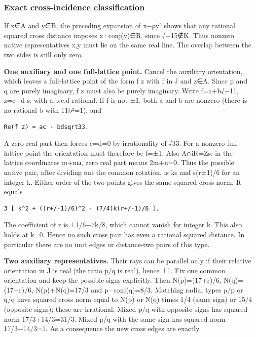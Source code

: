\documentclass[
  11pt,
]{article}
\begin{document}
\subsubsection{Exact cross-incidence
classification}\label{exact-cross-incidence-classification}

If x∈A and y∈B, the preceding expansion of \textbar x−ρy\textbar² shows
that any rational squared cross distance imposes x·conj(y)∈R, since
√−15∉K. Thus nonzero native representatives x,y must lie on the same
real line. The overlap between the two sides is still only zero.

\textbf{One auxiliary and one full-lattice point.} Cancel the auxiliary
orientation, which leaves a full-lattice point of the form f z with
\textbar f in J and z∈Λ. Since p and q are purely imaginary, f
z must also be purely imaginary. Write f=a+b√−11, z=c+d s, with a,b,c,d
rational. If f is not ±1, both a and b are nonzero (there is no rational
b with 11b²=1), and

\begin{verbatim}
Re(f z) = ac - bdsqrt33.
\end{verbatim}

A zero real part then forces c=d=0 by irrationality of √33. For a
nonzero full-lattice point the orientation must therefore be f=±1. Also
Λ∩iR=Zs: in the lattice coordinates m+nω, zero real part means 2m+n=0.
Thus the possible native pair, after dividing out the common rotation,
is ks and s(r±1)/6 for an integer k. Either order of the two points
gives the same squared cross norm. It equals

\begin{verbatim}
3 [ k^2 + ((r+/-1)/6)^2 - (7/4)k(r+/-1)/6 ].
\end{verbatim}

The coefficient of r is ±1/6−7k/8, which cannot vanish for integer k.
This also holds at k=0. Hence no such cross pair has even a rational
squared distance. In particular there are no unit edges or distance-two
pairs of this type.

\textbf{Two auxiliary representatives.} Their rays can be parallel only
if their relative orientation in J is real (the ratio p/q is real),
hence ±1. Fix one common orientation and keep the possible signs
explicitly. Then N(p)=(17+r)/6, N(q)=(17−r)/6, N(p)+N(q)=17/3 and
p·conj(q)=8/3. Matching radial types p/p or q/q have squared cross norm
equal to N(p) or N(q) times 1/4 (same sign) or 15/4 (opposite signs);
these are irrational. Mixed p/q with opposite signs has squared norm
17/3+14/3=31/3. Mixed p/q with the same sign has squared norm
17/3−14/3=1. As a consequence the new cross edges are exactly
\end{document}
